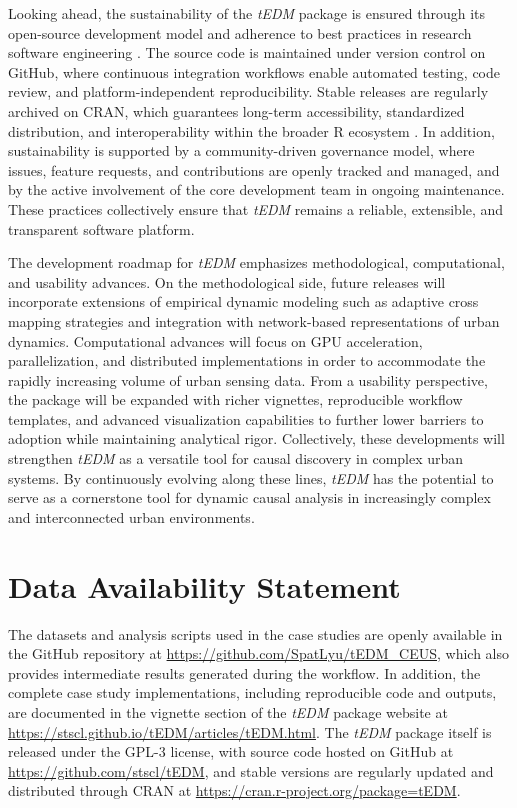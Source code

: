 \documentclass[authoryear,preprint,review,12pt]{elsarticle}
\begin{document}
Looking ahead, the sustainability of the \textit{tEDM} package is ensured through its open-source development model and adherence to best practices in research software engineering \citep{ropensci}. The source code is maintained under version control on GitHub, where continuous integration workflows enable automated testing, code review, and platform-independent reproducibility. Stable releases are regularly archived on CRAN, which guarantees long-term accessibility, standardized distribution, and interoperability within the broader R ecosystem \citep{r}. In addition, sustainability is supported by a community-driven governance model, where issues, feature requests, and contributions are openly tracked and managed, and by the active involvement of the core development team in ongoing maintenance. These practices collectively ensure that \textit{tEDM} remains a reliable, extensible, and transparent software platform.

The development roadmap for \textit{tEDM} emphasizes methodological, computational, and usability advances. On the methodological side, future releases will incorporate extensions of empirical dynamic modeling such as adaptive cross mapping strategies and integration with network-based representations of urban dynamics. Computational advances will focus on GPU acceleration, parallelization, and distributed implementations in order to accommodate the rapidly increasing volume of urban sensing data. From a usability perspective, the package will be expanded with richer vignettes, reproducible workflow templates, and advanced visualization capabilities to further lower barriers to adoption while maintaining analytical rigor. Collectively, these developments will strengthen \textit{tEDM} as a versatile tool for causal discovery in complex urban systems. By continuously evolving along these lines, \textit{tEDM} has the potential to serve as a cornerstone tool for dynamic causal analysis in increasingly complex and interconnected urban environments.

\section*{Data Availability Statement}

The datasets and analysis scripts used in the case studies are openly available in the GitHub repository at \url{https://github.com/SpatLyu/tEDM_CEUS}, which also provides intermediate results generated during the workflow. In addition, the complete case study implementations, including reproducible code and outputs, are documented in the vignette section of the \textit{tEDM} package website at \url{https://stscl.github.io/tEDM/articles/tEDM.html}. The \textit{tEDM} package itself is released under the GPL-3 license, with source code hosted on GitHub at \url{https://github.com/stscl/tEDM}, and stable versions are regularly updated and distributed through CRAN at \url{https://cran.r-project.org/package=tEDM}.

\baselineskip12pt
 
 


\end{document}
